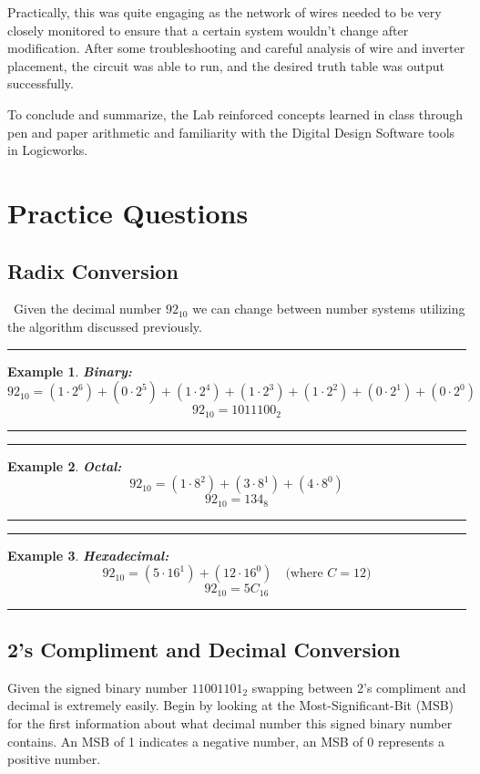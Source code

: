 \documentclass[12pt]{report}
\newtheorem{example}{Example}
\newenvironment{examp}
{\vspace{0.5cm}
\hrule
\begin{example}}
{\hrule
\vspace{0.5cm}
\end{example}}
\begin{document}
Practically, this was quite engaging as the network of wires needed to be very closely monitored to ensure that a certain system wouldn't change after modification. After some troubleshooting and careful analysis of wire and inverter placement, the circuit was able to run, and the desired truth table was output successfully.

To conclude and summarize, the Lab reinforced concepts learned in class through pen and paper arithmetic and familiarity with the Digital Design Software tools in Logicworks.
\section*{Practice Questions}
\subsection*{Radix Conversion} \
Given the decimal number \(92_{10}\) we can change between number systems utilizing the algorithm discussed previously.
\begin{examp}
	\textbf{Binary:}
	\[
		92_{10} = (1 \cdot 2^6) + (0 \cdot 2^5) + (1 \cdot 2^4) + (1 \cdot 2^3) + (1 \cdot 2^2) + (0 \cdot 2^1) + (0 \cdot 2^0)
	\]
	\[
		92_{10} = 1011100_2
	\]
\end{examp}

\begin{examp}
	\textbf{Octal:}
	\[
		92_{10} = (1 \cdot 8^2) + (3 \cdot 8^1) + (4 \cdot 8^0)
	\]
	\[
		92_{10} = 134_8
	\]
\end{examp}

\begin{examp}
	\textbf{Hexadecimal:}
	\[
		92_{10} = (5 \cdot 16^1) + (12 \cdot 16^0) \quad \text{(where \(C = 12\))}
	\]
	\[
		92_{10} = 5C_{16}
	\]
\end{examp}
\pagebreak
\subsection*{2's Compliment and Decimal Conversion}
Given the signed binary number \(11001101_2\) swapping between 2's compliment and decimal is extremely easily. Begin by looking at the Most-Significant-Bit (MSB) for the first information about what decimal number this signed binary number contains. An MSB of 1 indicates a negative number, an MSB of 0 represents a positive number.
\end{document}
